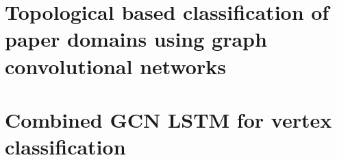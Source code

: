 \chapter{Topological based classification of paper domains
using graph convolutional networks}
\label{chap:topo_gcn}



\chapter{Combined GCN LSTM for vertex classification}
\label{chap:nips}

